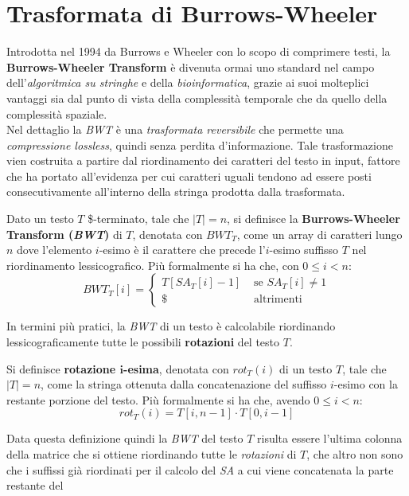 \section{Trasformata di Burrows-Wheeler}
\label{secbwt}
Introdotta nel 1994 da Burrows e Wheeler con lo scopo di comprimere testi, la
\textbf{Burrows-Wheeler Transform} \cite{bwt} è divenuta ormai uno standard nel
campo dell'\textit{algoritmica su stringhe} e della \textit{bioinformatica},
grazie ai suoi molteplici vantaggi sia dal punto di vista della complessità
temporale che da quello della complessità spaziale.\\
Nel dettaglio la \textit{BWT} è una \textit{trasformata reversibile} che
permette una \textit{compressione lossless}, quindi senza perdita
d'informazione. Tale trasformazione vien costruita a partire dal riordinamento
dei caratteri del testo in input, fattore che ha 
portato all'evidenza per cui caratteri uguali tendono ad essere posti
consecutivamente all'interno della stringa prodotta dalla trasformata.
\begin{definizione}
  Dato un testo $T$ \$-terminato, tale che $|T|=n$, si definisce la
  \textbf{Burrows-Wheeler Transform (\textit{BWT})} di $T$, denotata con
  $BWT_T$, come un array di caratteri lungo $n$ dove l'elemento $i$-esimo è il
  carattere che precede l'$i$-esimo suffisso $T$ nel riordinamento
  lessicografico. Più formalmente si ha che, con $0\leq i<n$:
  \[BWT_T[i]=
    \begin{cases}
      T[SA_T[i]-1]&\mbox{ se } SA_T[i]\neq 1\\
      \$&\mbox{ altrimenti}
    \end{cases}
  \]
\end{definizione}
In termini più pratici, la \textit{BWT} di un testo è calcolabile riordinando
lessicograficamente tutte le possibili \textbf{rotazioni} del testo $T$.
\begin{definizione}
  Si definisce \textbf{rotazione $\mathbf{i}$-esima}, denotata con $rot_T(i)$ di
  un testo $T$, tale che $|T|=n$, come la stringa ottenuta dalla concatenazione
  del suffisso $i$-esimo con la restante porzione del testo. Più formalmente si
  ha che, avendo $0\leq i<n$:
  \[rot_T(i)=T[i,n-1]\cdot T[0,i-1]\]
\end{definizione}
Data questa definizione quindi la \textit{BWT} del testo $T$ risulta essere
l'ultima colonna della matrice che si ottiene riordinando tutte le
\textit{rotazioni} di $T$, che altro non sono che i suffissi già riordinati per
il calcolo del \textit{SA} a cui viene concatenata la parte restante del
